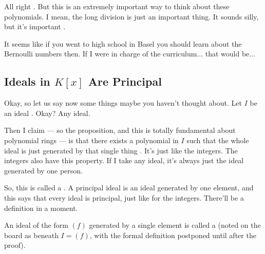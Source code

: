 \begin{speech}[00:30:46 - 00:31:17]
All right . But this is an extremely important way to think about these polynomials. I mean, the long division is just an important thing. It sounds silly, but it's important .

It seems like if you went to high school in Basel you should learn about the Bernoulli numbers then. If I were in charge of the curriculum... that would be...
\end{speech}

\begin{hidden}
\end{hidden}

\subsection{Ideals in \texorpdfstring{$K[x]$}{K[x]} Are Principal}

\begin{speech}[00:31:17 - 00:32:20]
Okay, so let us say now some things maybe you haven't thought about. Let $I$ be an ideal . Okay? Any ideal.

Then I claim --- so the proposition, and this is totally fundamental about polynomial rings --- is that there exists a polynomial in $I$ such that the whole ideal is just generated by that single thing . It's just like the integers. The integers also have this property. If I take any ideal, it's always just the ideal generated by one person.

So, this is called a  . A principal ideal is an ideal generated by one element, and this says that every ideal is principal, just like for the integers. There'll be a definition in a moment.
\end{speech}

\begin{content}

An ideal of the form $(f)$ generated by a single element is called a  (noted on the board as  beneath $I = (f)$, with the formal definition postponed until after the proof).
\end{content}

